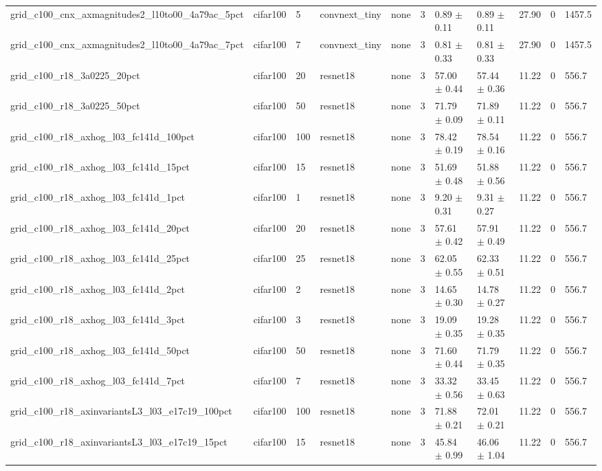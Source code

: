 \begin{tabular}{lllllllllll}
grid_c100_cnx_axmagnitudes2_l10to00_4a79ac_5pct & cifar100 & 5 & convnext_tiny & none & 3 & 0.89 $\pm$ 0.11 & 0.89 $\pm$ 0.11 & 27.90 & 0 & 1457.5 \\
grid_c100_cnx_axmagnitudes2_l10to00_4a79ac_7pct & cifar100 & 7 & convnext_tiny & none & 3 & 0.81 $\pm$ 0.33 & 0.81 $\pm$ 0.33 & 27.90 & 0 & 1457.5 \\
grid_c100_r18_3a0225_20pct & cifar100 & 20 & resnet18 & none & 3 & 57.00 $\pm$ 0.44 & 57.44 $\pm$ 0.36 & 11.22 & 0 & 556.7 \\
grid_c100_r18_3a0225_50pct & cifar100 & 50 & resnet18 & none & 3 & 71.79 $\pm$ 0.09 & 71.89 $\pm$ 0.11 & 11.22 & 0 & 556.7 \\
grid_c100_r18_axhog_l03_fc141d_100pct & cifar100 & 100 & resnet18 & none & 3 & 78.42 $\pm$ 0.19 & 78.54 $\pm$ 0.16 & 11.22 & 0 & 556.7 \\
grid_c100_r18_axhog_l03_fc141d_15pct & cifar100 & 15 & resnet18 & none & 3 & 51.69 $\pm$ 0.48 & 51.88 $\pm$ 0.56 & 11.22 & 0 & 556.7 \\
grid_c100_r18_axhog_l03_fc141d_1pct & cifar100 & 1 & resnet18 & none & 3 & 9.20 $\pm$ 0.31 & 9.31 $\pm$ 0.27 & 11.22 & 0 & 556.7 \\
grid_c100_r18_axhog_l03_fc141d_20pct & cifar100 & 20 & resnet18 & none & 3 & 57.61 $\pm$ 0.42 & 57.91 $\pm$ 0.49 & 11.22 & 0 & 556.7 \\
grid_c100_r18_axhog_l03_fc141d_25pct & cifar100 & 25 & resnet18 & none & 3 & 62.05 $\pm$ 0.55 & 62.33 $\pm$ 0.51 & 11.22 & 0 & 556.7 \\
grid_c100_r18_axhog_l03_fc141d_2pct & cifar100 & 2 & resnet18 & none & 3 & 14.65 $\pm$ 0.30 & 14.78 $\pm$ 0.27 & 11.22 & 0 & 556.7 \\
grid_c100_r18_axhog_l03_fc141d_3pct & cifar100 & 3 & resnet18 & none & 3 & 19.09 $\pm$ 0.35 & 19.28 $\pm$ 0.35 & 11.22 & 0 & 556.7 \\
grid_c100_r18_axhog_l03_fc141d_50pct & cifar100 & 50 & resnet18 & none & 3 & 71.60 $\pm$ 0.44 & 71.79 $\pm$ 0.35 & 11.22 & 0 & 556.7 \\
grid_c100_r18_axhog_l03_fc141d_7pct & cifar100 & 7 & resnet18 & none & 3 & 33.32 $\pm$ 0.56 & 33.45 $\pm$ 0.63 & 11.22 & 0 & 556.7 \\
grid_c100_r18_axinvariantsL3_l03_e17c19_100pct & cifar100 & 100 & resnet18 & none & 3 & 71.88 $\pm$ 0.21 & 72.01 $\pm$ 0.21 & 11.22 & 0 & 556.7 \\
grid_c100_r18_axinvariantsL3_l03_e17c19_15pct & cifar100 & 15 & resnet18 & none & 3 & 45.84 $\pm$ 0.99 & 46.06 $\pm$ 1.04 & 11.22 & 0 & 556.7 \\

\end{tabular}
